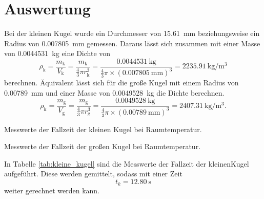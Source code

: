 \section{Auswertung}
\label{sec:Auswertung}
\newcommand{\kleineKugelDurchmesser}{\SI{15.61}{\milli\meter} }
\newcommand{\kleineKugelRadius}{\SI{0.007805}{\milli\meter} }
\newcommand{\kleineKugelMasse}{\SI{0.0044531}{\kilo\gram} }
\newcommand{\kleineKugelDichte}{\SI{2235.91}{\kilo\gram\per\cubic\meter} }

\newcommand{\grosseKugelRadius}{\SI{0.00789}{\milli\meter} }
\newcommand{\grosseKugelDurchmesser}{\SI{0.01578}{\milli\meter} }
\newcommand{\grosseKugelMasse}{\SI{0.0049528}{\kilo\gram} }
\newcommand{\grosseKugelDichte}{\SI{2407.31}{\kilo\gram\per\cubic\meter} }

Bei der kleinen Kugel wurde ein Durchmesser von \kleineKugelDurchmesser beziehungsweise ein Radius von \kleineKugelRadius gemessen.
Daraus lässt sich zusammen mit einer Masse von \kleineKugelMasse eine Dichte von
\begin{equation}
  \rho_\text{k}
  = \frac{m_\text{k}}{V_\text{k}}
  = \frac{m_\text{k}}{\frac{4}{3}\pi r_\text{k}^3}
  = \frac{\kleineKugelMasse}{\frac{4}{3}\pi\times(\kleineKugelRadius)^3}
  = \kleineKugelDichte
\end{equation}
berechnen.
Äquivalent lässt sich für die große Kugel mit einem Radius von \grosseKugelRadius und einer Masse von \grosseKugelMasse die Dichte berechnen.
\begin{equation}
  \rho_\text{k}
  = \frac{m_\text{g}}{V_\text{g}}
  = \frac{m_\text{g}}{\frac{4}{3}\pi r_\text{g}^3}
  = \frac{\grosseKugelMasse}{\frac{4}{3}\pi\times(\grosseKugelRadius)^3}
  = \grosseKugelDichte.
\end{equation}

\begin{table}
  \centering
  
  \caption{Messwerte der Fallzeit der kleinen Kugel bei Raumtemperatur.}
  \label{tab:kleine_kugel}
\end{table}

\begin{table}
  \centering
  
  \caption{Messwerte der Fallzeit der großen Kugel bei Raumtemperatur.}
  \label{tab:grosse_kugel}
\end{table}


\noindent In Tabelle \autoref{tab:kleine_kugel} sind die Messwerte der Fallzeit der kleinenKugel aufgeführt.
Diese werden gemittelt, sodass mit einer Zeit
\begin{equation}
  t_{k} = \SI{12.80}{\second}
\end{equation}
weiter gerechnet werden kann.


